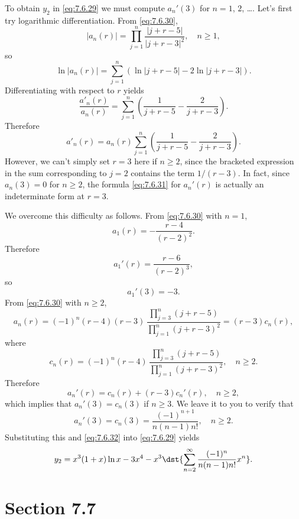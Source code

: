 \begin{examplesolution}
To obtain $y_{2}$ in \eqref{eq:7.6.29} we must compute $a_{n}'(3)$ for $n=1$, $2$, \dots. Let's
first try logarithmic differentiation. From \eqref{eq:7.6.30},
\[
  |a_{n}(r)|=\prod_{j=1}^{n}\frac{|j+r-5|}{|j+r-3|^{2}},\quad n\ge1,
\]
so
\[
  \ln|a_{n}(r)|=\sum^{n}_{j=1}\left(\ln|j+r-5|-2\ln|j+r-3|\right).
\]
Differentiating with respect to $r$ yields
\[
  \frac{a'_{n}(r)}{a_{n}(r)}=\sum^{n}_{j=1}\left(\frac{1}{j+r-5}-\frac{2}{j+r-3}\right).
\]
Therefore
\begin{equation}
  \label{eq:7.6.31}a'_{n}(r)=a_{n}(r)\sum^{n}_{j=1}\left(\frac{1}{j+r-5}-\frac{2}{j+r-3}\right).
\end{equation}
However, we can't simply set $r=3$ here if $n\ge2$, since the bracketed expression in the sum
corresponding to $j=2$ contains the term $1/(r-3)$. In fact, since $a_{n}(3)=0$ for $n\ge2$, the
formula \eqref{eq:7.6.31} for $a_{n}'(r)$ is actually an indeterminate form at $r=3$.

We overcome this difficulty as follows. From \eqref{eq:7.6.30} with $n=1$,
\[
  a_{1}(r)=-\frac{r-4}{(r-2)^{2}}.
\]
Therefore
\[
  a_{1}'(r)=\frac{r-6}{(r-2)^{3}},
\]
so
\begin{equation}
  \label{eq:7.6.32}a_{1}'(3)=-3.
\end{equation}
From \eqref{eq:7.6.30} with $n\ge2$,
\[
  a_{n}(r)=(-1)^{n}(r-4)(r-3)\,\frac{\prod_{j=3}^{n}(j+r-5)}{\prod_{j=1}^{n}(j+r-3)^{2}}=(r-3)c_{n}(r),
\]
where
\[
  c_{n}(r)=(-1)^{n}(r-4)\, \frac{\prod_{j=3}^{n}(j+r-5)}{\prod_{j=1}^{n}(j+r-3)^{2}},\quad n\ge2.
\]
Therefore
\[
  a_{n}'(r)=c_{n}(r)+(r-3)c_{n}'(r),\quad n\ge2,
\]
which implies that $a_{n}'(3)=c_{n}(3)$ if $n\ge3$. We leave it to you to verify that
\[
  a_{n}'(3)=c_{n}(3)=\frac{(-1)^{n+1}}{n(n-1)n!},\quad n\ge2.
\]
Substituting this and \eqref{eq:7.6.32} into \eqref{eq:7.6.29} yields
\[
  y_{2}=x^{3}(1+x)\ln x-3x^{4}-x^{3}\dst{\sum_{n=2}^{\infty}\frac{(-1)^{n}}{n(n-1)n!}x^{n}}.
\]
\end{examplesolution}

\section*{Section 7.7}
\setcounter{chapter}{7}
\setcounter{section}{7}

